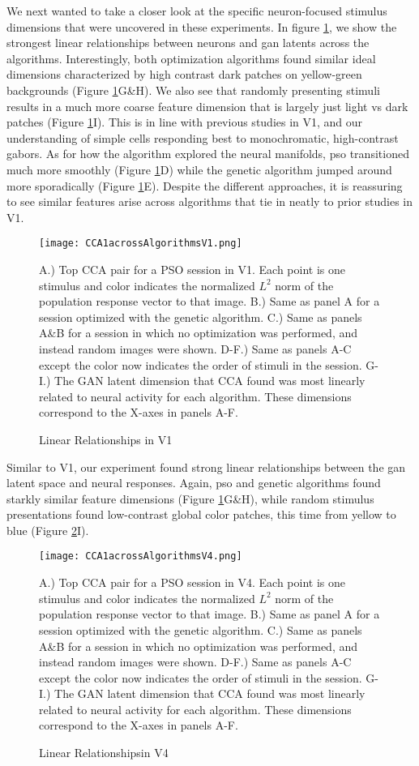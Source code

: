 We next wanted to take a closer look at the specific neuron-focused stimulus dimensions that were uncovered in these experiments. In figure \ref{fig:cca1V1}, we show the strongest linear relationships between neurons and \gls{gan} latents across the algorithms. Interestingly, both optimization algorithms found similar ideal dimensions characterized by high contrast dark patches on yellow-green backgrounds (Figure \ref{fig:cca1V1}G\&H). We also see that randomly presenting stimuli results in a much more coarse feature dimension that is largely just light vs dark patches (Figure \ref{fig:cca1V1}I). This is in line with previous studies in V1, and our understanding of simple cells responding best to monochromatic, high-contrast gabors. As for how the algorithm explored the neural manifolds, \gls{pso} transitioned much more smoothly (Figure \ref{fig:cca1V1}D) while the genetic algorithm jumped around more sporadically (Figure \ref{fig:cca1V1}E). Despite the different approaches, it is reassuring to see similar features arise across algorithms that tie in neatly to prior studies in V1.

\begin{figure}
	\centering
	\texttt{[image: CCA1acrossAlgorithmsV1.png]}
	\caption{Linear Relationships in V1}{A.) Top CCA pair for a PSO session in V1. Each point is one stimulus and color indicates the normalized $L^2$ norm of the population response vector to that image. B.) Same as panel A for a session optimized with the genetic algorithm. C.) Same as panels A\&B for a session in which no optimization was performed, and instead random images were shown. D-F.) Same as panels A-C except the color now indicates the order of stimuli in the session. G-I.) The GAN latent dimension that CCA found was most linearly related to neural activity for each algorithm. These dimensions correspond to the X-axes in panels A-F.}
	\label{fig:cca1V1}
\end{figure}

Similar to V1, our experiment found strong linear relationships between the \gls{gan} latent space and neural responses. Again, \gls{pso} and genetic algorithms found starkly similar feature dimensions (Figure \ref{fig:cca1V1}G\&H), while random stimulus presentations found low-contrast global color patches, this time from yellow to blue (Figure \ref{fig:cca1V4}I).

\begin{figure}
	\centering
	\texttt{[image: CCA1acrossAlgorithmsV4.png]}
	\caption{Linear Relationshipsin V4}{A.) Top CCA pair for a PSO session in V4. Each point is one stimulus and color indicates the normalized $L^2$ norm of the population response vector to that image. B.) Same as panel A for a session optimized with the genetic algorithm. C.) Same as panels A\&B for a session in which no optimization was performed, and instead random images were shown. D-F.) Same as panels A-C except the color now indicates the order of stimuli in the session. G-I.) The GAN latent dimension that CCA found was most linearly related to neural activity for each algorithm. These dimensions correspond to the X-axes in panels A-F.}
	\label{fig:cca1V4}
\end{figure}





